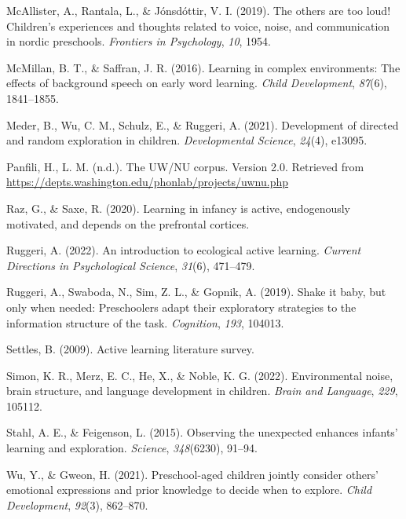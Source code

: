 \documentclass[10pt, letterpaper]{article}
\newenvironment{CSLReferences}%
  {}%
  {\par}
\begin{document}
\begin{CSLReferences}{1}{0}
\leavevmode{}%
McAllister, A., Rantala, L., \& Jónsdóttir, V. I. (2019). The others are
too loud! Children's experiences and thoughts related to voice, noise,
and communication in nordic preschools. \emph{Frontiers in Psychology},
\emph{10}, 1954.

\leavevmode{}%
McMillan, B. T., \& Saffran, J. R. (2016). Learning in complex
environments: The effects of background speech on early word learning.
\emph{Child Development}, \emph{87}(6), 1841--1855.

\leavevmode{}%
Meder, B., Wu, C. M., Schulz, E., \& Ruggeri, A. (2021). Development of
directed and random exploration in children. \emph{Developmental
Science}, \emph{24}(4), e13095.

\leavevmode{}%
Panfili, H., L. M. (n.d.). The UW/NU corpus. Version 2.0. Retrieved from
\url{https://depts.washington.edu/phonlab/projects/uwnu.php}

\leavevmode{}%
Raz, G., \& Saxe, R. (2020). Learning in infancy is active, endogenously
motivated, and depends on the prefrontal cortices.

\leavevmode{}%
Ruggeri, A. (2022). An introduction to ecological active learning.
\emph{Current Directions in Psychological Science}, \emph{31}(6),
471--479.

\leavevmode{}%
Ruggeri, A., Swaboda, N., Sim, Z. L., \& Gopnik, A. (2019). Shake it
baby, but only when needed: Preschoolers adapt their exploratory
strategies to the information structure of the task. \emph{Cognition},
\emph{193}, 104013.

\leavevmode{}%
Settles, B. (2009). Active learning literature survey.

\leavevmode{}%
Simon, K. R., Merz, E. C., He, X., \& Noble, K. G. (2022). Environmental
noise, brain structure, and language development in children.
\emph{Brain and Language}, \emph{229}, 105112.

\leavevmode{}%
Stahl, A. E., \& Feigenson, L. (2015). Observing the unexpected enhances
infants' learning and exploration. \emph{Science}, \emph{348}(6230),
91--94.

\leavevmode{}%
Wu, Y., \& Gweon, H. (2021). Preschool-aged children jointly consider
others' emotional expressions and prior knowledge to decide when to
explore. \emph{Child Development}, \emph{92}(3), 862--870.

\end{CSLReferences}


\end{document}
